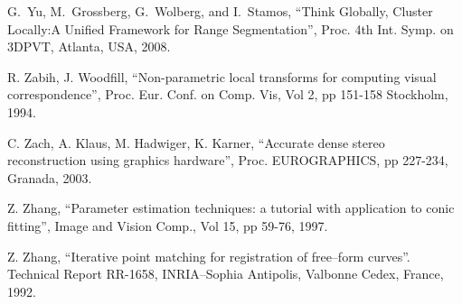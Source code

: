 \documentclass[twocolumn,oneside]{book}
\begin{document}
\begin{thebibliography}{99}
G.~Yu, M.~Grossberg, G.~Wolberg, and I.~Stamos,
``Think Globally, Cluster Locally:A Unified Framework for Range Segmentation'',
Proc. 4th Int. Symp. on 3DPVT, Atlanta, USA, 2008.

R. Zabih,  J. Woodfill,
``Non-parametric local transforms for computing visual correspondence'',
Proc. Eur. Conf. on Comp. Vis, Vol 2, pp 151-158 Stockholm, 1994.

C. Zach, A. Klaus, M. Hadwiger, K. Karner,
``Accurate dense stereo reconstruction using graphics hardware'',
Proc. EUROGRAPHICS, pp 227-234, Granada, 2003.

Z. Zhang,
``Parameter estimation techniques: a tutorial with application to conic fitting'',
Image and Vision Comp., Vol 15, pp 59-76, 1997.

Z. Zhang,
``Iterative point matching for registration of free--form curves''.
Technical Report RR-1658, INRIA--Sophia Antipolis, Valbonne Cedex, France,
1992.

\end{thebibliography}
\end{document}
